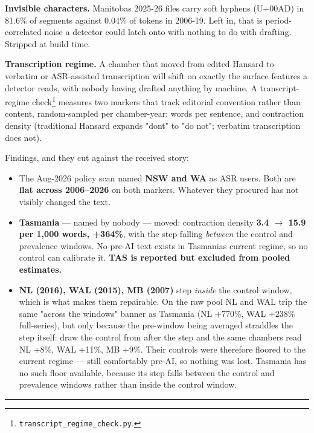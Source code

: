 \textbf{Invisible characters.} Manitoba\textquotesingle s 2025-26 files carry soft hyphens
(U+00AD) in 81.6\% of segments against 0.04\% of tokens in 2006-19. Left in,
that is period-correlated noise a detector could latch onto with nothing to
do with drafting. Stripped at build time.

\textbf{Transcription regime.} A chamber that moved from edited Hansard to verbatim or ASR-assisted transcription will shift on exactly the surface features a detector reads, with nobody having drafted anything by machine. A transcript-regime check\footnote{\texttt{transcript\_\allowbreak{}regime\_\allowbreak{}check.\allowbreak{}py}.} measures two markers that track editorial convention rather than content, random-sampled per chamber-year: words per sentence, and contraction density (traditional Hansard expands "don\textquotesingle t" to "do not"; verbatim transcription does not).

Findings, and they cut against the received story:

\begin{itemize}
\tightlist
\item
  The Aug-2026 policy scan named \textbf{NSW and WA} as ASR users. Both are
  \textbf{flat across 2006--2026} on both markers. Whatever they procured has not
  visibly changed the text.
\item
  \textbf{Tasmania} --- named by nobody --- moved: contraction density \textbf{3.4 \(\rightarrow\) 15.9
  per 1,000 words, +364\%}, with the step falling \emph{between} the control and
  prevalence windows. No pre-AI text exists in Tasmania\textquotesingle s current regime, so
  no control can calibrate it. \textbf{TAS is reported but excluded from pooled
  estimates.}
\item
  \textbf{NL (2016), WAL (2015), MB (2007)} step \emph{inside} the control window,
  which is what makes them repairable. On the raw pool NL and WAL trip the
  same "across the windows" banner as Tasmania (NL +770\%, WAL +238\%
  full-series), but only because the pre-window being averaged straddles the
  step itself: draw the control from after the step and the same chambers
  read NL +8\%, WAL +11\%, MB +9\%. Their controls were therefore floored to the
  current regime --- still comfortably pre-AI, so nothing was lost. Tasmania has
  no such floor available, because its step falls between the control and
  prevalence windows rather than inside the control window.
\end{itemize}

\begin{center}\rule{0.5\linewidth}{0.5pt}\end{center}

